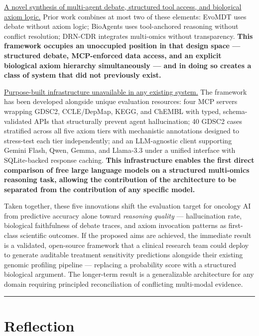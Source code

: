 \documentclass[12pt, letterpaper]{article}
\begin{document}
\uline{A novel synthesis of multi-agent debate, structured tool access, and biological axiom logic.}
Prior work combines at most two of these elements: EvoMDT \cite{evomdt2026} uses debate
without axiom logic; BioAgents \cite{mehandru2025bioagents} uses tool-anchored reasoning
without conflict resolution; DRN-CDR \cite{saranya2024drncdr} integrates multi-omics without
transparency. \textbf{This framework occupies an unoccupied position in that design space ---
structured debate, MCP-enforced data access, and an explicit biological axiom hierarchy
simultaneously --- and in doing so creates a class of system that did not previously exist.}

\uline{Purpose-built infrastructure unavailable in any existing system.}
The framework has been developed alongside unique evaluation resources: four MCP servers
wrapping GDSC2, CCLE/DepMap, KEGG, and ChEMBL with typed, schema-validated APIs that
structurally prevent agent hallucination; 40 GDSC2 cases stratified across all five axiom tiers
with mechanistic annotations designed to stress-test each tier independently; and an
LLM-agnostic client supporting Gemini Flash, Qwen, Gemma, and Llama-3.3 under a unified
interface with SQLite-backed response caching. \textbf{This infrastructure enables the first
direct comparison of free large language models on a structured multi-omics reasoning task,
allowing the contribution of the architecture to be separated from the contribution of any
specific model.}

Taken together, these five innovations shift the evaluation target for oncology AI from
predictive accuracy alone toward \textit{reasoning quality} --- hallucination rate, biological
faithfulness of debate traces, and axiom invocation patterns as first-class scientific outcomes.
If the proposed aims are achieved, the immediate result is a validated, open-source framework
that a clinical research team could deploy to generate auditable treatment sensitivity predictions
alongside their existing genomic profiling pipeline --- replacing a probability score with a
structured biological argument. The longer-term result is a generalizable architecture for any
domain requiring principled reconciliation of conflicting multi-modal evidence.

\vspace{0.8em}
\hrule
\vspace{0.5em}

\section*{Reflection}
\end{document}
